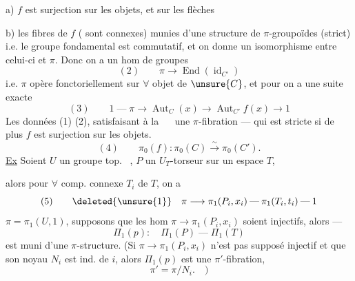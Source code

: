 a) $f$ est  surjection  sur les objets, et  sur les flèches

b) les fibres de $f$ ( sont connexes)  munies d'une structure de $\pi$-groupoïdes (strict) i.e. le groupe fondamental est commutatif, et on donne un isomorphisme entre celui-ci et $\pi$.
Donc on a un hom de groupes
\[(2)\qquad\pi\longrightarrow\operatorname{End}(\operatorname{id}_{C'})\]
i.e. $\pi$ opère fonctoriellement sur $\forall$ objet de $\unsure{C}$, et pour  on a une suite exacte
\[(3)\qquad1\;\text{---}\;\pi\longrightarrow\operatorname{Aut}_C(x)\longrightarrow\operatorname{Aut}_{C'}f(x)\longrightarrow1\]
Les données (1) (2), satisfaisant à la \ \  une $\pi$-fibration --- qui est stricte si de plus $f$ est surjection sur les objets.
\[(4)\qquad\pi_0(f):\pi_0(C)\xrightarrow{\sim}\pi_0(C').\]
\uline{Ex} Soient $U$ un groupe top. \ , $P$ un $U_T$-torseur sur un espace $T$,

alors pour $\forall$ comp. connexe $T_i$ de $T$,
on a 
\[
(5)\qquad \deleted{\unsure{1}}\quad
\pi\longrightarrow\pi_1(P_i,x_i)\mathbin{\text{---}}\pi_1(T_i,t_i)\mathbin{\text{---}}1
\]
$\pi=\pi_1(U,1)$, supposons que les
hom $\pi\longrightarrow\pi_1(P_i,x_i)$ soient injectifs, alors ---
\[
\Pi_1(p):\quad \Pi_1(P)\mathbin{\text{---}}\Pi_1(T)
\]
est muni d'une $\pi$-structure. (Si
$\pi\longrightarrow\pi_1(P_i,x_i)$  n'est pas supposé injectif
et que son noyau $N_i$ est ind. de $i$,
alors $\Pi_1(p)$ est  une $\pi'$-fibration,
\[
\pi'=\pi/N_i.\quad)
\]

